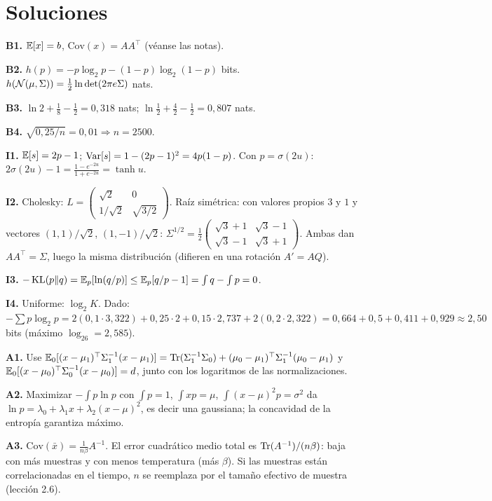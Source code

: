 \documentclass[11pt,a4paper]{article}
\begin{document}
\section{Soluciones}
\begin{solucion}
\textbf{B1.} $\mathbb{E}[x]=b$, $\mathrm{Cov}(x)=AA^\top$ (véanse las notas).

\textbf{B2.} $h(p)=-p\log_2p-(1-p)\log_2(1-p)$ bits. $h(\mathcal{N}(\mu,\Sigma))=\frac12\ln\det(2\pi e\Sigma)$ nats.

\textbf{B3.} $\ln2+\frac18-\frac12=0{,}318$ nats; $\ln\frac12+\frac42-\frac12=0{,}807$ nats.

\textbf{B4.} $\sqrt{0{,}25/n}=0{,}01\Rightarrow n=2500$.

\textbf{I1.} $\mathbb{E}[s]=2p-1$; $\operatorname{Var}[s]=1-(2p-1)^2=4p(1-p)$. Con $p=\sigma(2u)$: $2\sigma(2u)-1=\frac{1-e^{-2u}}{1+e^{-2u}}=\tanh u$.

\textbf{I2.} Cholesky: $L=\begin{pmatrix}\sqrt2&0\\1/\sqrt2&\sqrt{3/2}\end{pmatrix}$. Raíz simétrica: con valores propios $3$ y $1$ y vectores $(1,1)/\sqrt2$, $(1,-1)/\sqrt2$: $\Sigma^{1/2}=\frac12\begin{pmatrix}\sqrt3+1&\sqrt3-1\\\sqrt3-1&\sqrt3+1\end{pmatrix}$. Ambas dan $AA^\top=\Sigma$, luego la misma distribución (difieren en una rotación $A'=AQ$).

\textbf{I3.} $-\operatorname{KL}(p\|q)=\mathbb{E}_p[\ln(q/p)]\le\mathbb{E}_p[q/p-1]=\int q-\int p=0$.

\textbf{I4.} Uniforme: $\log_2K$. Dado: $-\sum p\log_2p=2(0{,}1\cdot3{,}322)+0{,}25\cdot2+0{,}15\cdot2{,}737+2(0{,}2\cdot2{,}322)=0{,}664+0{,}5+0{,}411+0{,}929\approx2{,}50$ bits (máximo $\log_26=2{,}585$).

\textbf{A1.} Use $\mathbb{E}_0[(x-\mu_1)^\top\Sigma_1^{-1}(x-\mu_1)]=\operatorname{Tr}(\Sigma_1^{-1}\Sigma_0)+(\mu_0-\mu_1)^\top\Sigma_1^{-1}(\mu_0-\mu_1)$ y $\mathbb{E}_0[(x-\mu_0)^\top\Sigma_0^{-1}(x-\mu_0)]=d$, junto con los logaritmos de las normalizaciones.

\textbf{A2.} Maximizar $-\int p\ln p$ con $\int p=1$, $\int x p=\mu$, $\int(x-\mu)^2p=\sigma^2$ da $\ln p=\lambda_0+\lambda_1x+\lambda_2(x-\mu)^2$, es decir una gaussiana; la concavidad de la entropía garantiza máximo.

\textbf{A3.} $\mathrm{Cov}(\bar x)=\frac{1}{n\beta}A^{-1}$. El error cuadrático medio total es $\operatorname{Tr}(A^{-1})/(n\beta)$: baja con más muestras y con menos temperatura (más $\beta$). Si las muestras están correlacionadas en el tiempo, $n$ se reemplaza por el tamaño efectivo de muestra (lección 2.6).
\end{solucion}
\end{document}
